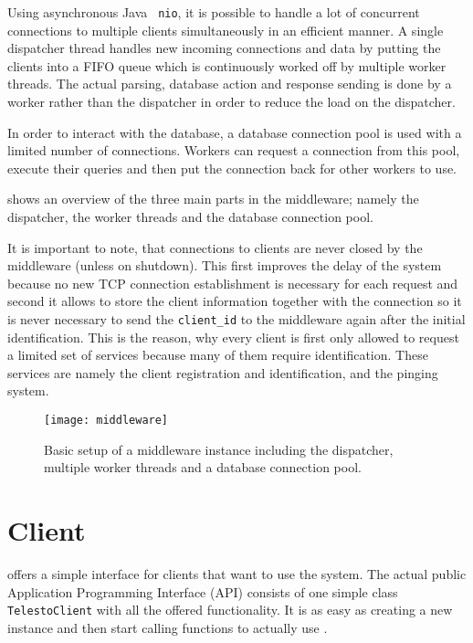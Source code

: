 \documentclass[a4paper, oneside]{csthesis}
\begin{document}
    Using asynchronous Java {\tt
    nio}, it is possible to handle a lot of concurrent connections to
    multiple clients simultaneously in an efficient manner. A single
    dispatcher thread handles new incoming connections and data by putting
    the clients into a FIFO queue which is continuously worked off by multiple
    worker threads. The actual parsing, database action and response sending is done by
    a worker rather than the dispatcher in order to reduce the load on the
    dispatcher.
    
    In order to interact with the database, a database connection pool is used
    with a limited number of connections. Workers can request a connection from
    this pool, execute their queries and then put the connection back for other
    workers to use.
    
     shows an overview of the three main parts in the
    middleware; namely the dispatcher, the worker threads and the database
    connection pool.
    
    It is important to note, that connections to clients are never closed by the
    middleware (unless on shutdown). This first improves the delay of the
    system because no new TCP connection establishment is necessary for each
    request and second it allows to store the client information together with
    the connection so it is never necessary to send the {\tt client\_id} to the
    middleware again after the initial identification. This is the reason, why
    every client is first only allowed to request a limited set of services
    because many of them require identification. These services are namely the
    client registration and identification, and the pinging system.

    \begin{figure}[ht]
        \centering
            \texttt{[image: middleware]}
            \caption{Basic setup of a middleware instance including the
            dispatcher, multiple worker threads and a database connection pool.}
            \label{fig:middleware}
    \end{figure}


\section{Client}
    \telesto{} offers a simple interface for clients that want to use the system.
    The actual public Application Programming Interface (API) consists of one
    simple class {\tt TelestoClient} with all the offered functionality. It is
    as easy as creating a new instance and then start calling functions to
    actually use \telesto.
    
\end{document}

